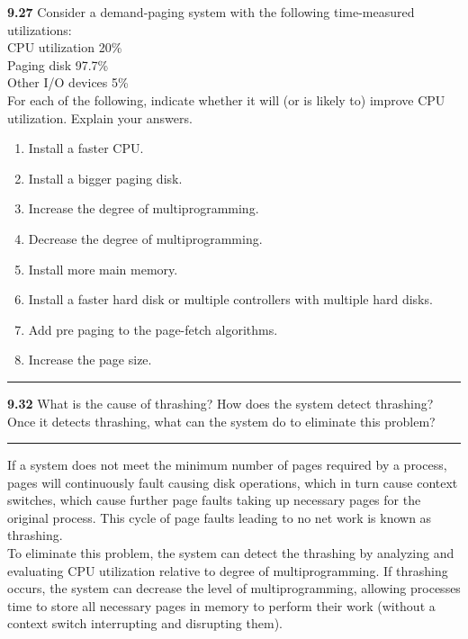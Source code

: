 \documentclass[12pt]{jhwhw}
\begin{document}
	\begin{addmargin}[1em]{}
	\end{addmargin}

\textbf{9.27}  
	Consider a demand-paging system with the following time-measured utilizations: \\
	CPU utilization 20\% \\
	Paging disk 97.7\% \\
	Other I/O devices 5\% \\
	For each of the following, indicate whether it will (or is likely to) improve
	CPU utilization. Explain your answers.
	\begin{enumerate}
		\item Install a faster CPU.
		\item Install a bigger paging disk.
		\item Increase the degree of multiprogramming.
		\item Decrease the degree of multiprogramming.
		\item Install more main memory.
		\item Install a faster hard disk or multiple controllers with multiple hard disks.
		\item Add pre paging to the page-fetch algorithms.
		\item Increase the page size.
	\end{enumerate}
\textcolor[RGB]{240,240,240}{\rule{\textwidth}{0.5pt}}\bigbreak

	\begin{addmargin}[1em]{}
	\end{addmargin}

\textbf{9.32}  
	What is the cause of thrashing? How does the system detect thrashing? Once it detects 
	thrashing, what can the system do to eliminate this problem?
\textcolor[RGB]{240,240,240}{\rule{\textwidth}{0.5pt}}\bigbreak

	\begin{addmargin}[1em]{}
		If a system does not meet the minimum number of pages required by a process, pages will
		continuously fault causing disk operations, which in turn cause context switches, which cause
		further page faults taking up necessary pages for the original process. This cycle of page faults
		leading to no net work is known as thrashing. \\
		To eliminate this problem, the system can detect the thrashing by analyzing and evaluating
		CPU utilization relative to degree of multiprogramming. If thrashing occurs, the system
		can decrease the level of multiprogramming, allowing processes time to store all necessary
		pages in memory to perform their work (without a context switch interrupting and disrupting them).
	\end{addmargin}
\end{document}
